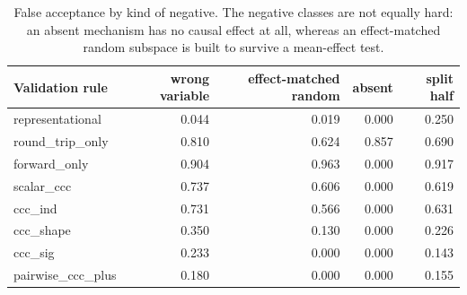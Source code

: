 \begin{table}[t]
\centering
\small
\begin{tabular}{lrrrr}
\toprule
Validation rule & wrong variable & effect-matched random & absent & split half \\
\midrule
representational & 0.044 & 0.019 & 0.000 & 0.250 \\
round\_trip\_only & 0.810 & 0.624 & 0.857 & 0.690 \\
forward\_only & 0.904 & 0.963 & 0.000 & 0.917 \\
scalar\_ccc & 0.737 & 0.606 & 0.000 & 0.619 \\
ccc\_ind & 0.731 & 0.566 & 0.000 & 0.631 \\
ccc\_shape & 0.350 & 0.130 & 0.000 & 0.226 \\
ccc\_sig & 0.233 & 0.000 & 0.000 & 0.143 \\
pairwise\_ccc\_plus & 0.180 & 0.000 & 0.000 & 0.155 \\
\bottomrule
\end{tabular}
\caption{False acceptance by kind of negative. The negative classes are not equally hard: an absent mechanism has no causal effect at all, whereas an effect-matched random subspace is built to survive a mean-effect test.}
\label{tab:fa_by_negative_case}
\end{table}